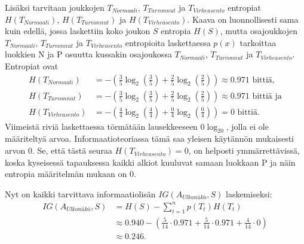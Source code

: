 \documentclass[12pt,finnish]{tktltiki2}
\theoremstyle{definition}
\theoremstyle{remark}
\begin{document}
Lisäksi tarvitaan joukkojen $T_{Normaali}$, $T_{Turvonnut}$ ja $T_{Virheasento}$ entropiat $H(T_{Normaali})$, $H(T_{Turvonnut})$
ja $H(T_{Virheasento})$. Kaava on luonnollisesti sama kuin edellä, jossa laskettiin koko joukon $S$ entropia $H(S)$, mutta
osajoukkojen $T_{Normaali}$, $T_{Turvonnut}$ ja $T_{Virheasento}$ entropioita laskettaessa $p(x)$
tarkoittaa luokkien N ja P osuutta kussakin osajoukossa $T_{Normaali}$, $T_{Turvonnut}$ ja $T_{Virheasento}$.
Entropiat ovat
\begin{equation*}
\begin{split}
H(T_{Normaali}) &= -\left(\frac{3}{5}\log_2\left(\frac{3}{5}\right) + \frac{2}{5}\log_2\left(\frac{2}{5}\right)\right) \approx 0.971 \mbox{ bittiä,} \\
H(T_{Turvonnut}) &= -\left(\frac{3}{5}\log_2\left(\frac{3}{5}\right) + \frac{2}{5}\log_2\left(\frac{2}{5}\right)\right) \approx 0.971 \mbox{ bittiä ja} \\ 
H(T_{Virheasento}) &= -\left(\frac{4}{4}\log_2\left(\frac{4}{4}\right) + \frac{0}{4}\log_2\left(\frac{0}{4}\right)\right) = 0 \mbox{ bittiä.}
\end{split}
\end{equation*}
Viimeistä riviä laskettaessa törmätään lausekkeeseen $0\log_20$, jolla ei ole määriteltyä arvoa. Informaatioteoriassa tämä saa yleisen
käytännön mukaisesti arvon 0. Se, että tästä seuraa $H(T_{Virheasento}) = 0$, on helposti ymmärrettävissä, koska kyseisessä tapauksessa
kaikki alkiot kuuluvat samaan luokkaan P ja näin entropia määritelmän mukaan on $0$.

Nyt on kaikki tarvittava informaatiolisän $IG(A_{Ulkonäkö},S)$ laskemiseksi:
\begin{equation*}
\begin{split}
IG(A_{Ulkonäkö},S) &= H(S) -\sum_{t = 1}^{n} p(T_t)H(T_t) \\
		   &\approx 0.940 - \left( \frac{5}{14}\cdot0.971 + \frac{5}{14}\cdot0.971  + \frac{4}{14}\cdot0 \right) \\
                   &\approx 0.246.
\end{split}
\end{equation*}
\end{document}
